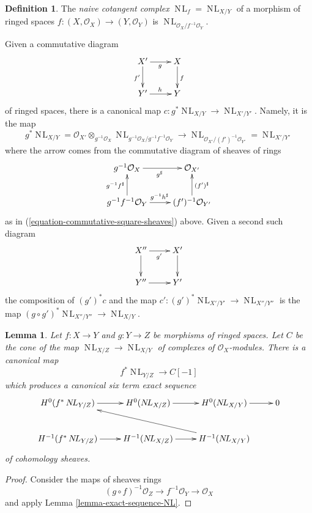 \documentclass{stacks-project}
\theoremstyle{plain}
\newtheorem{lemma}[subsection]{Lemma}
\theoremstyle{definition}
\newtheorem{definition}[subsection]{Definition}
\theoremstyle{remark}
\numberwithin{equation}{subsection}
\def\NL{\mathop{N\!L}\nolimits}
\begin{document}
\begin{definition}
\label{definition-cotangent-complex-morphism-ringed-topoi}
The {\it naive cotangent complex} $\NL_f = \NL_{X/Y}$ of a morphism of ringed
spaces $f : (X, \mathcal{O}_X) \to (Y, \mathcal{O}_Y)$ is
$\NL_{\mathcal{O}_X/f^{-1}\mathcal{O}_Y}$.
\end{definition}

\noindent
Given a commutative diagram
$$
\xymatrix{
X' \ar[r]_g \ar[d]_{f'} & X \ar[d]^f \\
Y' \ar[r]^h & Y
}
$$
of ringed spaces, there is a canonical map $c : g^*\NL_{X/Y} \to \NL_{X'/Y'}$.
Namely, it is the map
$$
g^*\NL_{X/Y} =
\mathcal{O}_{X'} \otimes_{g^{-1}\mathcal{O}_X}
\NL_{g^{-1}\mathcal{O}_X/g^{-1}f^{-1}\mathcal{O}_Y}
\longrightarrow
\NL_{\mathcal{O}_{X'}/(f')^{-1}\mathcal{O}_{Y'}} = \NL_{X'/Y'}
$$
where the arrow comes from the commutative diagram of sheaves of rings
$$
\xymatrix{
g^{-1}\mathcal{O}_X \ar[r]_{g^\sharp} &
\mathcal{O}_{X'} \\
g^{-1}f^{-1}\mathcal{O}_Y
\ar[r]^{g^{-1}h^\sharp}
\ar[u]^{g^{-1}f^\sharp} &
(f')^{-1}\mathcal{O}_{Y'} \ar[u]_{(f')^\sharp}
}
$$
as in (\ref{equation-commutative-square-sheaves}) above.
Given a second such diagram
$$
\xymatrix{
X'' \ar[r]_{g'} \ar[d] & X' \ar[d] \\
Y'' \ar[r] & Y'
}
$$
the composition of $(g')^*c$ and the map
$c' : (g')^*\NL_{X'/Y'} \to \NL_{X''/Y''}$
is the map $(g \circ g')^*\NL_{X''/Y''} \to \NL_{X/Y}$.

\begin{lemma}
\label{lemma-exact-sequence-NL-ringed-topoi}
Let $f : X \to Y$ and $g : Y \to Z$ be morphisms of ringed spaces.
Let $C$ be the cone of the map $\NL_{X/Z} \to \NL_{X/Y}$ of complexes
of $\mathcal{O}_X$-modules. There is a canonical map
$$
f^*\NL_{Y/Z} \to C[-1]
$$
which produces a canonical six term exact sequence
$$
\xymatrix{
H^0(f^*\NL_{Y/Z}) \ar[r] &
H^0(\NL_{X/Z}) \ar[r] &
H^0(\NL_{X/Y}) \ar[r] &
0 \\
H^{-1}(f^*\NL_{Y/Z}) \ar[r] &
H^{-1}(\NL_{X/Z}) \ar[r] &
H^{-1}(\NL_{X/Y}) \ar[llu]
}
$$
of cohomology sheaves.
\end{lemma}

\begin{proof}
Consider the maps of sheaves rings
$$
(g \circ f)^{-1}\mathcal{O}_Z \to f^{-1}\mathcal{O}_Y \to \mathcal{O}_X
$$
and apply Lemma \ref{lemma-exact-sequence-NL}.
\end{proof}











\end{document}
